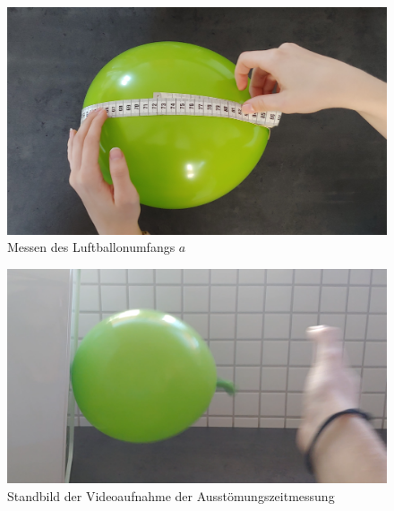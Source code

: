 \documentclass{article}
\begin{document}
    \begin{figure}[!h]\label{fig:Umfang}
        \centering
        \includegraphics[width=\textwidth]{luftballon_umfang_messung.jpg}
        \caption{Messen des Luftballonumfangs \(a\)}
    \end{figure}

    \begin{figure}[!h]\label{fig:Festgeklebt}
        \centering
        \includegraphics[width=\textwidth]{lufballon_festgeklebt.png}
        \caption{Standbild der Videoaufnahme der Ausstömungszeitmessung}
    \end{figure}
\end{document}

